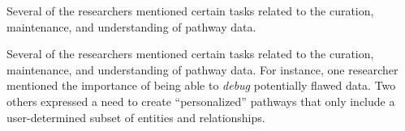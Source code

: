 \documentclass[journal]{vgtc}                %
\begin{document}
Several of the researchers mentioned certain tasks related to the curation, maintenance, and understanding of pathway data.

Several of the researchers mentioned certain tasks related to the curation, maintenance, and understanding of pathway data. For instance, one researcher mentioned the importance of being able to \emph{debug} potentially flawed data. Two others expressed a need to create ``personalized'' pathways that only include a user-determined subset of entities and relationships.






%
%
%
\end{document}
